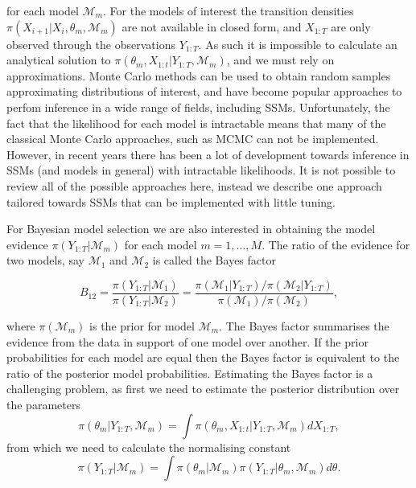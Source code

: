 \documentclass[a4paper,12pt]{article}
\begin{document}
\noindent for each model $\mathcal{M}_m$.
For the models of interest the transition densities $\pi(X_{i+1} \vert X_i, \theta_m, \mathcal{M}_m)$ are not available in closed form, and $X_{1:T}$ are only observed through the observations $Y_{1:T}$.
As such it is impossible to calculate an analytical solution to $\pi(\theta_m, X_{1:t} \vert Y_{1:T}, \mathcal{M}_m)$, and we must rely on approximations.
Monte Carlo methods can be used to obtain random samples approximating distributions of interest, and have become popular approaches to perfom inference in a wide range of fields, including SSMs.
Unfortunately, the fact that the likelihood for each model is intractable means that many of the classical Monte Carlo approaches, such as MCMC can not be implemented.
However, in recent years there has been a lot of development towards inference in SSMs (and models in general) with intractable likelihoods.
It is not possible to review all of the possible approaches here, instead we describe one approach tailored towards SSMs that can be implemented with little tuning.

For Bayesian model selection we are also interested in obtaining the model evidence $\pi(Y_{1:T} \vert \mathcal{M}_m)$ for each model $m=1,...,M$.
The ratio of the evidence for two models, say $\mathcal{M}_1$ and $\mathcal{M}_2$ is called the Bayes factor

\begin{equation} \label{Eqn:BF}
B_{12} = \frac{\pi(Y_{1:T} \vert \mathcal{M}_1)}{\pi(Y_{1:T} \vert \mathcal{M}_2)} = \frac{\pi(\mathcal{M}_1 \vert Y_{1:T}) / \pi(\mathcal{M}_2 \vert Y_{1:T})}{\pi(\mathcal{M}_1) / \pi(\mathcal{M}_2)},
\end{equation}


\noindent where $\pi(\mathcal{M}_m)$ is the prior for model $\mathcal{M}_m$.
The Bayes factor summarises the evidence from the data in support of one model over another.
If the prior probabilities for each model are equal then the Bayes factor is equivalent to the ratio of the posterior model probabilities.
Estimating the Bayes factor is a challenging problem, as first we need to estimate the posterior distribution over the parameters 
\begin{equation}
\pi (\theta_m \vert Y_{1:T}, \mathcal{M}_m) = \int \pi(\theta_m, X_{1:t} \vert Y_{1:T}, \mathcal{M}_m) dX_{1:T},
\end{equation}
\noindent from which we need to calculate the normalising constant
\begin{equation}
\pi (Y_{1:T} \vert \mathcal{M}_m) = \int \pi(\theta_m \vert \mathcal{M}_m) \pi(Y_{1:T} \vert \theta_m, \mathcal{M}_m) d\theta .
\end{equation}
 
\end{document}
